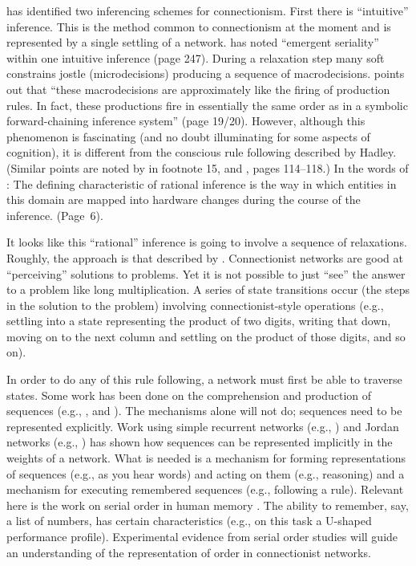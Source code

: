  has identified two inferencing schemes for
connectionism. First there is ``intuitive'' inference.  This is the
method common to connectionism at the moment and is represented by a
single settling of a network.   has noted ``emergent
seriality'' within one intuitive inference (page 247).  During a
relaxation step many soft constrains jostle (microdecisions)
producing a sequence of macrodecisions.  points out that
``these macrodecisions are approximately like the firing of production
rules.  In fact, these productions fire in essentially the same order
as in a symbolic forward-chaining inference system'' (page 19/20).
However, although this phenomenon is fascinating (and no doubt
illuminating for some aspects of cognition), it is different from the
conscious rule following described by Hadley. (Similar
points are noted by
 in footnote 15, and , pages 114--118.)  In
the words of :
\bssq
The defining characteristic of rational inference is the way in which
entities in this domain are mapped into hardware changes during the
course of the inference. (Page~6).
\essq

It looks like this ``rational'' inference is going to involve a
sequence of relaxations.  Roughly, the approach is that described by
.  Connectionist networks are good at ``perceiving''
solutions to problems.  Yet it is not possible to just ``see'' the
answer to a problem like long multiplication.  A series of state
transitions occur (the steps in the solution to the problem) involving
connectionist-style operations (e.g., settling into a state
representing the product of two digits, writing that down, moving on
to the next column and settling on the product of those digits, and
so on).


In order to do any of this rule following, a network must first be
able to traverse states. Some work has been done on the comprehension
and production of sequences (e.g., ,
 and ). The mechanisms
alone will not do; sequences need to be represented explicitly.  Work
using simple recurrent networks (e.g.,
) and Jordan networks (e.g., ) has
shown how sequences can be represented implicitly in the weights of a
network.  What is needed is a mechanism for forming representations of
sequences (e.g., as you hear words) and acting on them (e.g.,
reasoning) and a mechanism for executing remembered sequences (e.g.,
following a rule).  Relevant here is the work on serial order in human
memory \cite{lewamemo}.  The ability to remember, say, a list of
numbers, has certain characteristics (e.g., on this task a U-shaped
performance profile).  Experimental evidence from serial order studies
will guide an understanding of the representation of order in
connectionist networks.

